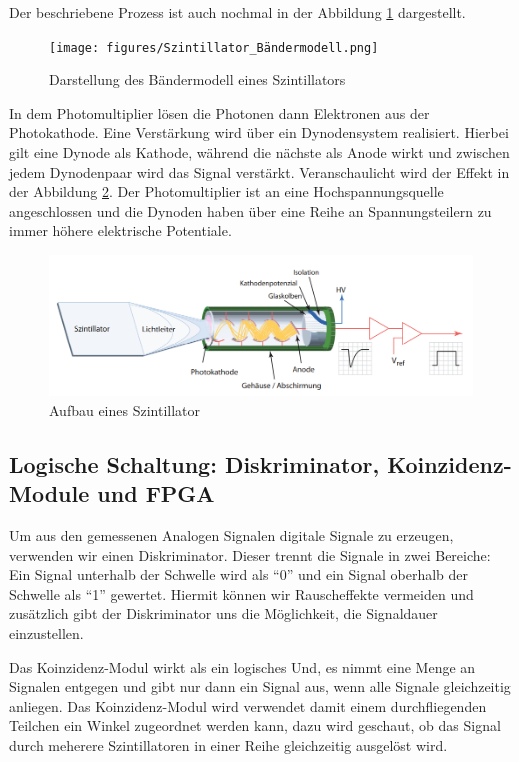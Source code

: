 \documentclass{article}
\begin{document}
Der beschriebene Prozess ist auch nochmal in der Abbildung \ref{fig:SzintillatorBandlücke} dargestellt.

\begin{figure}
    \centering
    \texttt{[image: figures/Szintillator\_Bändermodell.png]}
    \caption{Darstellung des Bändermodell eines Szintillators \cite{Wer}}
    \label{fig:SzintillatorBandlücke}
\end{figure}

In dem Photomultiplier lösen die Photonen dann Elektronen aus der Photokathode. Eine Verstärkung wird über ein Dynodensystem realisiert. Hierbei gilt eine Dynode als Kathode, während die nächste als Anode wirkt und zwischen jedem Dynodenpaar wird das Signal verstärkt. Veranschaulicht wird der Effekt in der Abbildung \ref{fig:AufbauSzinti}. Der Photomultiplier ist an eine Hochspannungsquelle angeschlossen und die Dynoden haben über eine Reihe an Spannungsteilern zu immer höhere elektrische Potentiale.

\begin{figure}[H]
    \centering
    \includegraphics[width=1\linewidth]{figures/SzintillatorAufbau.png}
    \caption{Aufbau eines Szintillator \cite{Wer}}
    \label{fig:AufbauSzinti}
\end{figure}

\subsection{Logische Schaltung: Diskriminator, Koinzidenz-Module und FPGA}
Um aus den gemessenen Analogen Signalen digitale Signale zu erzeugen, verwenden wir einen Diskriminator. 
Dieser trennt die Signale in zwei Bereiche: Ein Signal unterhalb der Schwelle wird als \enquote{0} und ein Signal oberhalb der Schwelle als \enquote{1} gewertet. 
Hiermit können wir Rauscheffekte vermeiden und zusätzlich gibt der Diskriminator uns die Möglichkeit, die Signaldauer einzustellen.

Das Koinzidenz-Modul wirkt als ein logisches Und, es nimmt eine Menge an Signalen entgegen und gibt nur dann ein Signal aus, 
wenn alle Signale gleichzeitig anliegen. Das Koinzidenz-Modul wird verwendet damit einem durchfliegenden Teilchen ein Winkel zugeordnet werden kann, 
dazu wird geschaut, ob das Signal durch meherere Szintillatoren in einer Reihe gleichzeitig ausgelöst wird.
\end{document}
